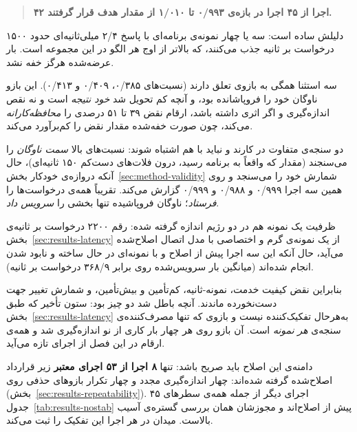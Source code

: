 \begin{quote}
\textbf{۴۲ اجرا از ۴۵ اجرا در بازه‌ی ۰/۹۹۳ تا ۱/۰۱۰ از مقدار هدف قرار گرفتند.}
\end{quote}

دلیلش ساده است: سه یا چهار نمونه‌ی برنامه‌ای با پاسخ ۲/۴ میلی‌ثانیه‌ای حدود ۱۵۰۰ درخواست بر
ثانیه جذب می‌کنند، که بالاتر از اوج هر الگو در این مجموعه است. بار عرضه‌شده هرگز خفه نشد.

سه استثنا همگی به بازوی  تعلق دارند (نسبت‌های ۰/۳۸۵، ۰/۴۰۹ و ۰/۴۱۳).
این بازو ناوگان خود را فروپاشانده بود، و آنچه کم تحویل شد \emph{خود نتیجه} است و نه نقص
اندازه‌گیری \mdash{} و اگر اثری داشته باشد، ارقام نقض ۳۹ تا ۵۱ درصدی را \emph{محافظه‌کارانه}
می‌کند، چون صورت خفه‌شده مقدار نقض را کم‌برآورد می‌کند.

دو سنجه‌ی متفاوت در کارند و نباید با هم اشتباه شوند: نسبت‌های بالا \emph{سمت ناوگان} را
می‌سنجند (مقدار  که واقعاً به برنامه رسید، درون فلات‌های دست‌کم ۱۵۰
ثانیه‌ای)، حال آنکه دروازه‌ی خودکار بخش~\ref{sec:method-validity} شمارش 
خود  را می‌سنجد و روی همین سه اجرا ۰/۹۹۹ و ۰/۹۸۸ و ۰/۹۹۹ گزارش می‌کند. 
تقریباً همه‌ی درخواست‌ها را \emph{فرستاد}؛ ناوگان فروپاشیده تنها بخشی را \emph{سرویس داد}.

ظرفیت یک نمونه هم در دو رژیم اندازه گرفته شده: رقم ۲۲۰۰ درخواست بر ثانیه‌ی
بخش~\ref{sec:results-latency} از یک نمونه‌ی گرم و اختصاصی با مدل اتصال اصلاح‌شده می‌آید،
حال آنکه این سه اجرا پیش از اصلاح و با نمونه‌ای در حال ساخته و نابود شدن انجام شده‌اند
(میانگین بار سرویس‌شده روی  برابر ۳۶۸/۹ درخواست بر ثانیه).

بنابراین نقض کیفیت خدمت، نمونه-ثانیه، کم‌تأمین و بیش‌تأمین، و شمارش تغییر جهت دست‌نخورده
ماندند. آنچه باطل شد دو چیز بود: ستون تأخیر \mdash{} که طبق بخش~\ref{sec:results-latency} به‌هرحال
تفکیک‌کننده نیست \mdash{} و بازوی  که تنها مصرف‌کننده‌ی سنجه‌ی \emph{هر نمونه} است.
آن بازو روی هر چهار بار کاری از نو اندازه‌گیری شد و همه‌ی ارقام  در این فصل
از اجرای تازه می‌آید.

دامنه‌ی این اصلاح باید صریح باشد: تنها \textbf{۸ اجرا از ۵۳ اجرای معتبر} زیر قرارداد
اصلاح‌شده گرفته شده‌اند: چهار اندازه‌گیری مجدد  و چهار تکرار بازوهای حذفی روی
 (بخش~\ref{sec:results-repeatability}). ۴۵ اجرای
دیگر \mdash{} از جمله همه‌ی سطرهای جدول~\ref{tab:results-nostab} \mdash{} پیش از اصلاح‌اند و
مجوزشان همان بررسی گستره‌ی آسیب بالاست. میدان  در  هر
اجرا این تفکیک را ثبت می‌کند.

